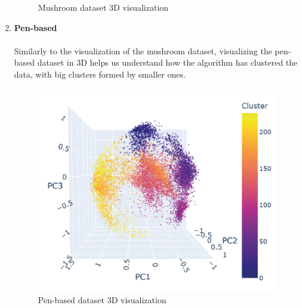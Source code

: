 \begin{enumerate}
\begin{figure}[H]
        \caption{Mushroom dataset 3D visualization}
        \end{figure}
    \item \textbf{Pen-based} 
    \\\\ Similarly to the visualization of the mushroom dataset, visualizing the pen-based dataset in 3D helps us understand how the algorithm has clustered the data, with big clusters formed by smaller ones.
    \begin{figure}[H]
    \centering
    \includegraphics[width=0.7\linewidth]{figures/XMeans/pen-based_visualization.png}
    \caption{Pen-based dataset 3D visualization}
\end{figure}

\end{enumerate}